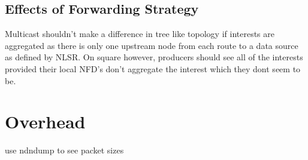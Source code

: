 \subsection{Effects of Forwarding Strategy}
Multicast shouldn't make a difference in tree like topology if interests are aggregated as there is only one upstream node from each route to a data source as defined by NLSR. On square however, producers should see all of the interests provided their local NFD's don't aggregate the interest which they dont seem to be.

\section{Overhead}
use ndndump to see packet sizes